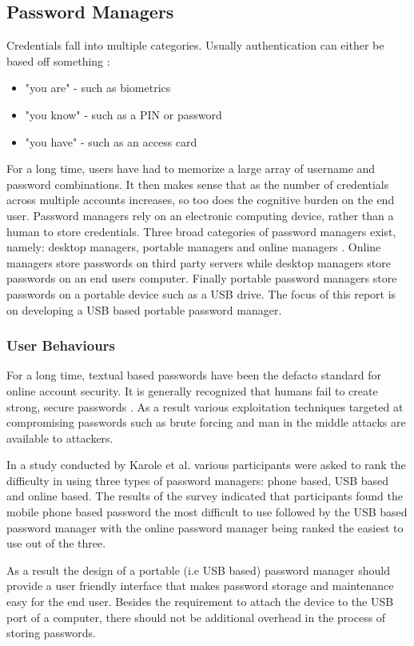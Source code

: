 \subsection{Password Managers}
Credentials fall into multiple categories. Usually authentication can either be based off something \cite{sso5}:
\begin{itemize}
  \item "you are" - such as biometrics
  \item "you know" - such as a PIN or password
  \item "you have" - such as an access card
\end{itemize}

For a long time, users have had to memorize a large array of username and password combinations. It then makes sense that as the number of credentials across multiple accounts increases, so too does the cognitive burden on the end user. Password managers rely on an electronic computing device, rather than a human to store credentials. Three broad categories of password managers exist, namely: desktop managers, portable managers and online managers \cite{sso5}. Online managers store passwords on third party servers while desktop managers store passwords on an end users computer. Finally portable password managers store passwords on a portable device such as a USB drive. The focus of this report is on developing a USB based portable password manager.

\subsubsection{User Behaviours}
For a long time, textual based passwords have been the defacto standard for online account security. It is generally recognized that humans fail to create strong, secure passwords \cite{sso6}. As a result various exploitation techniques targeted at compromising passwords such as brute forcing and man in the middle attacks are available to attackers.

In a study conducted by Karole et al. \cite{sso5} various participants were asked to rank the difficulty in using three types of password managers: phone based, USB based and online based. The results of the survey indicated that participants found the mobile phone based password the most difficult to use followed by the USB based password manager with the online password manager being ranked the easiest to use out of the three.

As a result the design of a portable (i.e USB based) password manager should provide a user friendly interface that makes password storage and maintenance easy for the end user. Besides the requirement to attach the device to the USB port of a computer, there should not be additional overhead in the process of storing passwords. 

